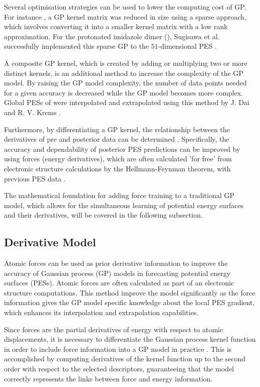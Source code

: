 Several optimisation strategies can be used to lower the computing cost of GP. 
For instance \cite{RasmussenW06}, a GP kernel matrix was reduced in size using a sparse approach, which involves converting it into a smaller kernel matrix with a low rank approximation.%
For the protonated imidazole dimer (), Sugisawa et al. successfully implemented this sparse GP to the $51$-dimensional PES \cite{Sugisawa2020}.

A composite GP kernel, which is created by adding or multiplying two or more distinct kernels, is an additional method to increase the complexity of the GP model.
By raising the GP model complexity, the number of data points needed for a given accuracy is decreased while the GP model becomes more complex.
Global PESs of  were interpolated and extrapolated using this method by J. Dai and R. V. Krems \cite{Dai2020}.

Furthermore, by differentiating a GP kernel, the relationship between the derivatives of pre and posterior data can be determined \cite{Solak2002, mchutchon_dierentiating_2013, https://doi.org/10.48550/arxiv.1704.00060}. Specifically, the accuracy and dependability of posterior PES predictions can be improved by using forces (energy derivatives), which are often calculated 'for free' from electronic structure calculations by the Hellmann-Feynman theorem, with previous PES data \cite{Deringer2021}. 

The mathematical foundation for adding force training to a traditional GP model, which allows for the simultaneous learning of potential energy surfaces and their derivatives, will be covered in the following subsection.

\subsection{Derivative Model} \label{subsec:2.3.2}
Atomic forces can be used as prior derivative information to improve the accuracy of Gaussian process (GP) models in forecasting potential energy surfaces (PESs).
Atomic forces are often calculated as part of an electronic structure computations.
This method improve the model significantly as the force information gives the GP model specific knowledge about the local PES gradient, which enhances its interpolation and extrapolation capabilities.

Since forces are the partial derivatives of energy with respect to atomic displacements, it is necessary to differentiate the Gaussian process kernel function in order to include force information into a GP model in practice \cite{GarijodelRo2019, Kaappa2021, Asnaashari2021, Deringer2021}.
This is accomplished by computing derivatives of the kernel function up to the second order with respect to the selected descriptors, guaranteeing that the model correctly represents the links between force and energy information.

